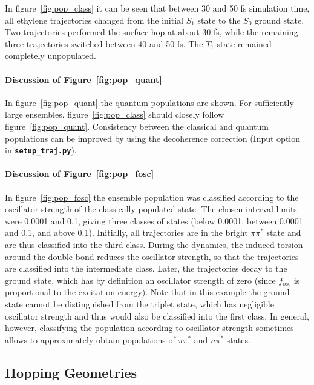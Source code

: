 \documentclass[a4paper,11pt,DIV=15,openany]{scrbook}
\newcommand{\ttt}[1]{\textbf{\texttt{#1}}}
\begin{document}
In figure~\ref{fig:pop_class} it can be seen that between 30 and 50 fs simulation time, all ethylene trajectories changed from the initial $S_1$ state to the $S_0$ ground state. Two trajectories performed the surface hop at about 30 fs, while the remaining three trajectories switched between 40 and 50 fs. The $T_1$ state remained completely unpopulated. 

\paragraph{Discussion of Figure~\ref{fig:pop_quant}}

In figure~\ref{fig:pop_quant} the quantum populations are shown. For sufficiently large ensembles, figure~\ref{fig:pop_class} should closely follow figure~\ref{fig:pop_quant}. Consistency between the classical and quantum populations can be improved by using the decoherence correction (Input option in \ttt{setup\_traj.py}).

\paragraph{Discussion of Figure~\ref{fig:pop_fosc}}

In figure~\ref{fig:pop_fosc} the ensemble population was classified according to the oscillator strength of the classically populated state. The chosen interval limits were 0.0001 and 0.1, giving three classes of states (below 0.0001, between 0.0001 and 0.1, and above 0.1). Initially, all trajectories are in the bright $\pi\pi^*$ state and are thus classified into the third class. During the dynamics, the induced torsion around the double bond reduces the oscillator strength, so that the trajectories are classified into the intermediate class. Later, the trajectories decay to the ground state, which has by definition an oscillator strength of zero (since $f_\text{osc}$ is proportional to the excitation energy). Note that in this example the ground state cannot be distinguished from the triplet state, which has negligible oscillator strength and thus would also be classified into the first class. In general, however, classifying the population according to oscillator strength sometimes allows to approximately obtain populations of $\pi\pi^*$ and $n\pi^*$ states.



\clearpage
\subsection{Hopping Geometries}
\end{document}
